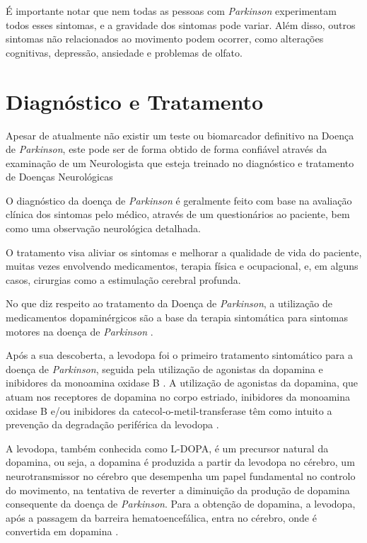 \documentclass[12pt,a4paper,twoside]{report}
\begin{document}
{É importante notar que nem todas as pessoas com \textit{Parkinson} experimentam todos esses sintomas, e a gravidade dos sintomas pode variar. Além disso, outros sintomas não relacionados ao movimento podem ocorrer, como alterações cognitivas, depressão, ansiedade e problemas de olfato.


\section{Diagnóstico e Tratamento}
Apesar de atualmente não existir um teste ou biomarcador definitivo na Doença de \textit{Parkinson}, este pode ser de forma obtido de forma confiável através da examinação de um Neurologista que esteja treinado no diagnóstico e tratamento de Doenças Neurológicas

O diagnóstico da doença de \textit{Parkinson} é geralmente feito com base na avaliação clínica dos sintomas pelo médico, através de um questionários ao paciente, bem como uma observação neurológica detalhada.

O tratamento visa aliviar os sintomas e melhorar a qualidade de vida do paciente, muitas vezes envolvendo medicamentos, terapia física e ocupacional, e, em alguns casos, cirurgias como a estimulação cerebral profunda.

No que diz respeito ao tratamento da Doença de \textit{Parkinson}, a utilização de medicamentos dopaminérgicos são a base da
terapia sintomática para sintomas motores na doença de \textit{Parkinson} \cite{Kobylecki393}.

Após a sua descoberta, a levodopa foi o primeiro tratamento sintomático para a doença de \textit{Parkinson}, seguida pela utilização de agonistas da dopamina e inibidores da monoamina oxidase B \cite{Kobylecki393}. A utilização de agonistas da dopamina, que atuam nos receptores de dopamina no corpo estriado, inibidores da monoamina oxidase B e/ou inibidores da catecol-o-metil-transferase têm como intuito a prevenção da degradação periférica da levodopa \cite{Kobylecki393}.

A levodopa, também conhecida como  L-DOPA, é um precursor natural da dopamina, ou seja, a dopamina é produzida a partir da levodopa no cérebro, um neurotransmissor no cérebro que desempenha um papel fundamental no controlo do movimento, na tentativa de reverter a diminuição da produção de dopamina consequente da doença de \textit{Parkinson}. Para a obtenção de dopamina, a levodopa, após a passagem da barreira hematoencefálica, entra no cérebro, onde é convertida em dopamina \cite{Kobylecki393}\cite{https://doi.org/10.1111/joim.13541}.

}
\end{document}
